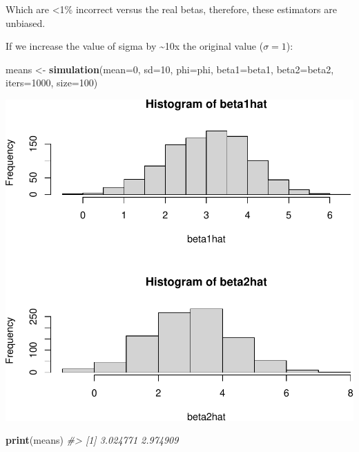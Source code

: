 \documentclass[]{article}
\newenvironment{Shaded}{\begin{snugshade}}{\end{snugshade}}
\newcommand{\CommentTok}[1]{\textcolor[rgb]{0.56,0.35,0.01}{\textit{#1}}}
\newcommand{\DataTypeTok}[1]{\textcolor[rgb]{0.13,0.29,0.53}{#1}}
\newcommand{\DecValTok}[1]{\textcolor[rgb]{0.00,0.00,0.81}{#1}}
\newcommand{\KeywordTok}[1]{\textcolor[rgb]{0.13,0.29,0.53}{\textbf{#1}}}
\newcommand{\NormalTok}[1]{#1}
\newcommand{\StringTok}[1]{\textcolor[rgb]{0.31,0.60,0.02}{#1}}
\begin{document}
Which are \textless{}1\% incorrect versus the real betas, therefore,
these estimators are unbiased.

\newpage

If we increase the value of sigma by \textasciitilde{}10x the original
value (\(\sigma = 1\)):

\begin{Shaded}
\begin{Highlighting}[]
\NormalTok{means <-}\StringTok{ }\KeywordTok{simulation}\NormalTok{(}\DataTypeTok{mean=}\DecValTok{0}\NormalTok{, }\DataTypeTok{sd=}\DecValTok{10}\NormalTok{, }\DataTypeTok{phi=}\NormalTok{phi, }\DataTypeTok{beta1=}\NormalTok{beta1, }\DataTypeTok{beta2=}\NormalTok{beta2, }\DataTypeTok{iters=}\DecValTok{1000}\NormalTok{, }\DataTypeTok{size=}\DecValTok{100}\NormalTok{)}
\end{Highlighting}
\end{Shaded}

\includegraphics{./figures/unnamed-chunk-7-1.pdf}

\begin{Shaded}
\begin{Highlighting}[]
\KeywordTok{print}\NormalTok{(means)}
\CommentTok{#> [1] 3.024771 2.974909}
\end{Highlighting}
\end{Shaded}
\end{document}
